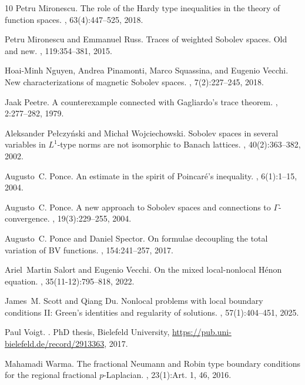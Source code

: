 \documentclass[12pt, reqno]{amsart}%
\theoremstyle{plain}  %
\theoremstyle{definition}  %
\numberwithin{equation}{section}
\begin{document}
{\begin{thebibliography}{10}
Petru Mironescu.
\newblock The role of the {H}ardy type inequalities in the theory of function
  spaces.
, 63(4):447--525, 2018.

Petru Mironescu and Emmanuel Russ.
\newblock Traces of weighted {S}obolev spaces. {O}ld and new.
, 119:354--381, 2015.

Hoai-Minh Nguyen, Andrea Pinamonti, Marco Squassina, and Eugenio Vecchi.
\newblock New characterizations of magnetic {S}obolev spaces.
, 7(2):227--245, 2018.

Jaak Peetre.
\newblock A counterexample connected with {G}agliardo's trace theorem.
, 2:277--282, 1979.

Aleksander Pe{\l}czy{\'n}ski and Micha{\l} Wojciechowski.
\newblock Sobolev spaces in several variables in {$L^1$}-type norms are not
  isomorphic to {B}anach lattices.
, 40(2):363--382, 2002.

Augusto~C. Ponce.
\newblock An estimate in the spirit of {P}oincar\'{e}'s inequality.
, 6(1):1--15, 2004.

Augusto~C. Ponce.
\newblock A new approach to {S}obolev spaces and connections to
  {$\Gamma$}-convergence.
, 19(3):229--255,
  2004.

Augusto~C. Ponce and Daniel Spector.
\newblock On formulae decoupling the total variation of {BV} functions.
, 154:241--257, 2017.

Ariel~Martin Salort and Eugenio Vecchi.
\newblock On the mixed local-nonlocal {H}\'{e}non equation.
, 35(11-12):795--818, 2022.

James~M. Scott and Qiang Du.
\newblock Nonlocal problems with local boundary conditions {II}: {G}reen's
  identities and regularity of solutions.
, 57(1):404--451, 2025.

Paul Voigt.
.
\newblock PhD thesis, Bielefeld University,
  \url{https://pub.uni-bielefeld.de/record/2913363}, 2017.

Mahamadi Warma.
\newblock The fractional {N}eumann and {R}obin type boundary conditions for the
  regional fractional {$p$}-{L}aplacian.
, 23(1):Art. 1, 46,
  2016.


\end{thebibliography}}
\end{document}
